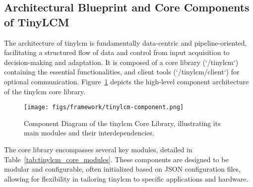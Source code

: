 \subsection{Architectural Blueprint and Core Components of TinyLCM}
\label{ssec:tinylcm_architecture_blueprint}

The architecture of \gls{tinylcm} is fundamentally data-centric and pipeline-oriented, facilitating a structured flow of data and control from input acquisition to decision-making and adaptation. It is composed of a core library (`/tinylcm`) containing the essential functionalities, and client tools (`/tinylcm/client`) for optional communication. Figure~\ref{fig:tinylcm_component_diagram} depicts the high-level component architecture of the \gls{tinylcm} core library.

\begin{figure}[htbp]
    \centering
    \texttt{[image: figs/framework/tinylcm-component.png]}
    \caption[Component Diagram of the TinyLCM Core Library]{Component Diagram of the \gls{tinylcm} Core Library, illustrating its main modules and their interdependencies.}
    \label{fig:tinylcm_component_diagram}
\end{figure}

The core library encompasses several key modules, detailed in Table~\ref{tab:tinylcm_core_modules}. These components are designed to be modular and configurable, often initialized based on JSON configuration files, allowing for flexibility in tailoring \gls{tinylcm} to specific applications and hardware.


